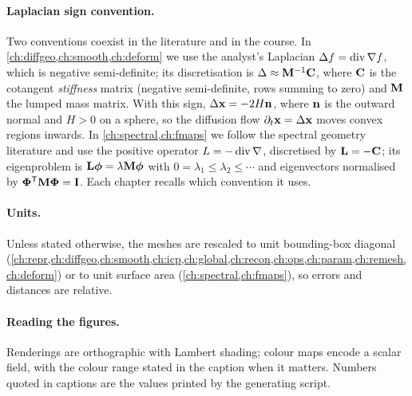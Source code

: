 \paragraph{Laplacian sign convention.} Two conventions coexist in the literature and in the
course. In \cref{ch:diffgeo,ch:smooth,ch:deform} we use the analyst's Laplacian
$\Delta f=\operatorname{div}\nabla f$, which is negative semi-definite; its discretisation is
$\Delta\approx\mathbf{M}^{-1}\mathbf{C}$, where $\mathbf{C}$ is the cotangent \emph{stiffness} matrix (negative
semi-definite, rows summing to zero) and $\mathbf{M}$ the lumped mass matrix. With this sign,
$\Delta\mathbf{x}=-2H\mathbf{n}$, where $\mathbf{n}$ is the outward normal and $H>0$ on a sphere, so the diffusion flow
$\partial_t\mathbf{x}=\Delta\mathbf{x}$ moves convex regions inwards.
In \cref{ch:spectral,ch:fmaps} we follow the spectral geometry literature and use the positive
operator $L=-\operatorname{div}\nabla$, discretised by $\mathbf{L}=-\mathbf{C}$; its eigenproblem is
$\mathbf{L}\boldsymbol{\phi}=\lambda\mathbf{M}\boldsymbol{\phi}$ with $0=\lambda_1\le\lambda_2\le\cdots$ and eigenvectors normalised
by $\boldsymbol{\Phi}^{\mathsf{T}}\mathbf{M}\boldsymbol{\Phi}=\mathbf{I}$. Each chapter recalls which convention it uses.

\paragraph{Units.} Unless stated otherwise, the meshes are rescaled to unit bounding-box
diagonal (\cref{ch:repr,ch:diffgeo,ch:smooth,ch:icp,ch:global,ch:recon,ch:ops,ch:param,ch:remesh,ch:deform})
or to unit surface area (\cref{ch:spectral,ch:fmaps}), so errors and distances are relative.

\paragraph{Reading the figures.} Renderings are orthographic with Lambert shading; colour maps
encode a scalar field, with the colour range stated in the caption when it matters. Numbers
quoted in captions are the values printed by the generating script.

